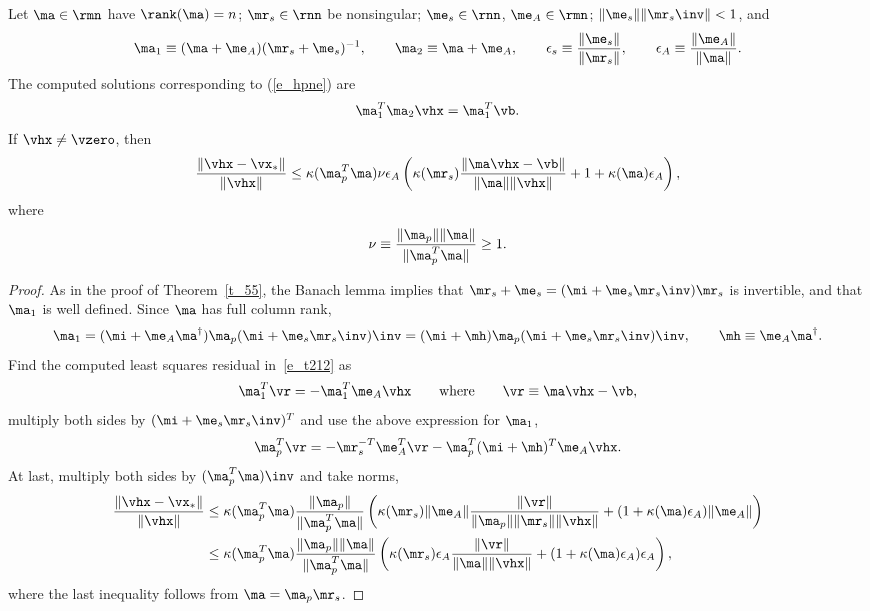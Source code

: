 \documentclass[final]{siamart220329}%
\begin{document}
\begin{theorem}\label{t_22}
Let $\ma\in\rmn$ have $\rank(\ma)=n$;  $\mr_s\in\rnn$ be nonsingular; $\me_s\in\rnn$, $\me_A\in\rmn$; $\|\me_s\|\|\mr_s\inv\|<1$, and
\begin{align*}
\ma_1\equiv (\ma+\me_A)(\mr_s+\me_s)^{-1},\qquad \ma_2\equiv \ma+\me_A, \qquad
\epsilon_s\equiv\frac{\|\me_s\|}{\|\mr_s\|}, 
\qquad \epsilon_A\equiv\frac{\|\me_A\|}{\|\ma\|}.
\end{align*}
The computed solutions corresponding to (\ref{e_hpne}) are
\begin{align}
\ma_1^T\ma_2\vhx=\ma_1^T\vb.\label{e_t212}
\end{align}
If  $\vhx\neq \vzero$, then
\begin{align}\label{e_hpnetrue}
    \frac{\|\vhx-\vx_*\|}{\|\vhx\|}\leq\kappa(\ma_p^T\ma)\nu\epsilon_A\left(\kappa(\mr_s)\frac{\|\ma\vhx-\vb\|}{\|\ma\|\|\vhx\|}+1+\kappa(\ma)\epsilon_A\right),
\end{align}
where 
\begin{align*}
\nu\equiv \frac{\|\ma_p\|\|\ma\|}{\|\ma_p^T\ma\|}\geq 1.
\end{align*}
\end{theorem} 

\begin{proof}
As in the proof of Theorem~\ref{t_55}, the Banach lemma \cite[Lemma 2.3.3]{GovL13} implies that $\mr_s+\me_s=(\mi+\me_s\mr_s\inv)\mr_s$ is invertible, and that $\ma_1$ is well defined. Since $\ma$
has full column rank,
\begin{align*}
\ma_1=(\mi+\me_A\ma^\dagger)\ma_p(\mi+\me_s\mr_s\inv)\inv=(\mi+\mh)\ma_p(\mi+\me_s\mr_s\inv)\inv, \qquad \mh\equiv\me_A\ma^\dagger.
\end{align*}
Find the computed least squares residual in~\eqref{e_t212} as 
\begin{align*}
\ma_1^T\vr=-\ma_1^T\me_A\vhx\qquad \text{where} \qquad 
\vr\equiv\ma\vhx-\vb,
\end{align*}
multiply both sides by $(\mi+\me_s\mr_s\inv)^T$ and use the above
expression for $\ma_1$,
\begin{align*}
   \ma_p^T\vr=-\mr_s^{-T}\me_A^T\vr-\ma_p^T(\mi+\mh)^T\me_A\vhx.
\end{align*}
At last, multiply both sides by $(\ma_p^T\ma)\inv$ and take norms, 
\begin{align*}
    \frac{\|\vhx-\vx_*\|}{\|\vhx\|}&\leq\kappa(\ma_p^T\ma)\frac{\|\ma_p\|}{\|\ma_p^T\ma\|}\left(\kappa(\mr_s)\|\me_A\|\frac{\|\vr\|}{\|\ma_p\|\|\mr_s\|\|\vhx\|}+(1+\kappa(\ma)\epsilon_A)\|\me_A\|\right)
    \\
    &\leq\kappa(\ma_p^T\ma)\frac{\|\ma_p\|\|\ma\|}{\|\ma_p^T\ma\|}\left(\kappa(\mr_s)\epsilon_A\frac{\|\vr\|}{\|\ma\|\|\vhx\|}+(1+\kappa(\ma)\epsilon_A)\epsilon_A\right),
\end{align*}
where the last inequality follows from $\ma=\ma_p\mr_s$.
\end{proof}
\end{document}
